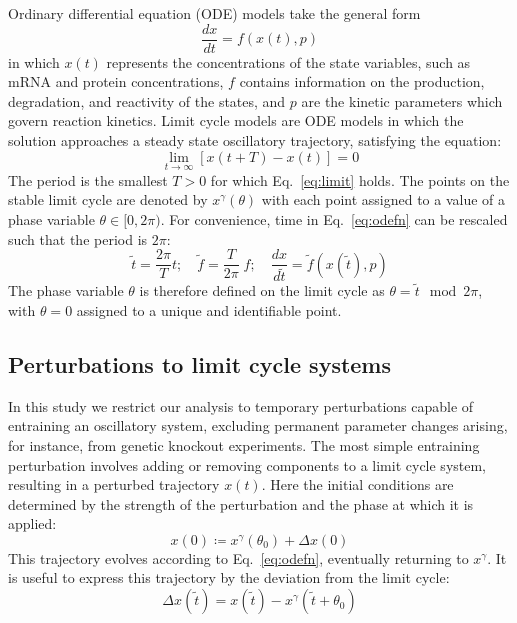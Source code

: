 \documentclass[11pt, letterpaper]{article}
\begin{document}
Ordinary differential equation (ODE) models take the general form
\begin{equation}
  \frac{dx}{dt} = f(x(t), p)
  \label{eq:odefn}
\end{equation}
in which $x(t)$ represents the concentrations of the state variables, such as mRNA and protein concentrations, $f$ contains information on the production, degradation, and reactivity of the states, and $p$ are the kinetic parameters which govern reaction kinetics.
Limit cycle models are ODE models in which the solution approaches a steady state oscillatory trajectory, satisfying the equation: \begin{equation}
  \lim_{t \to \infty} \left[ x(t + T) - x(t) \right] = 0
  \label{eq:limit}
\end{equation}
The period is the smallest $T > 0$ for which Eq.~\ref{eq:limit} holds.
The points on the stable limit cycle are denoted by $x^\gamma(\theta)$ with each point assigned to a value of a phase variable $\theta \in [0, 2\pi)$.
For convenience, time in Eq.~\ref{eq:odefn} can be rescaled such that the period is $2\pi$:
\begin{equation}
  \tilde{t} = \frac{2\pi}{T}t; \quad \tilde{f} = \frac{T}{2\pi}\;f; \quad \frac{dx}{d\tilde{t}} = \tilde{f}(x(\tilde{t}), p)
  \label{eq:that}
\end{equation}
The phase variable $\theta$ is therefore defined on the limit cycle as $\theta = \tilde{t}\mod 2\pi$, with $\theta = 0$ assigned to a unique and identifiable point.

\subsection*{Perturbations to limit cycle systems}

In this study we restrict our analysis to temporary perturbations capable of entraining an oscillatory system, excluding permanent parameter changes arising, for instance, from genetic knockout experiments.
The most simple entraining perturbation involves adding or removing components to a limit cycle system, resulting in a perturbed trajectory $x(t)$.
Here the initial conditions are determined by the strength of the perturbation and the phase at which it is applied:
\begin{equation}
  x(0) \coloneqq x^\gamma(\theta_0) + \Delta x(0)
  \label{eq:stateperturbation}
\end{equation}
This trajectory evolves according to Eq.~\ref{eq:odefn}, eventually returning to $x^\gamma$.
It is useful to express this trajectory by the deviation from the limit cycle:
\begin{equation}
  \Delta x(\tilde{t}) = x(\tilde{t}) - x^\gamma(\tilde{t} + \theta_0)
  \label{eq:delxt}
\end{equation}
\end{document}
